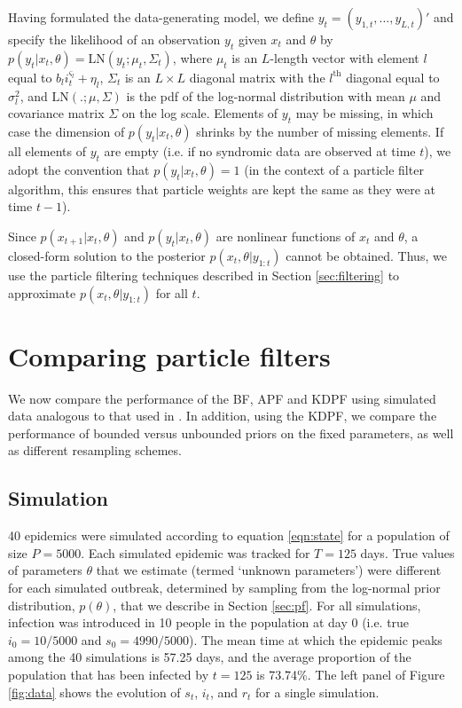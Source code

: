 \documentclass{elsarticle}
\begin{document}
Having formulated the data-generating model, we define $y_t = (y_{1,t},\ldots,y_{L,t})'$ and specify the likelihood of an observation $y_t$ given $x_t$ and $\theta$ by $p(y_t|x_t,\theta) = \mbox{LN}(y_t;\mu_t,\Sigma_t)$, where $\mu_t$ is an $L$-length vector with element $l$ equal to $b_li_t^{\varsigma_l} + \eta_l$, $\Sigma_t$ is an $L \times L$ diagonal matrix with the $l^{\mbox{th}}$ diagonal equal to $\sigma_l^2$, and $\mbox{LN}(.;\mu,\Sigma)$ is the pdf of the log-normal distribution with mean $\mu$ and covariance matrix $\Sigma$ on the log scale. Elements of $y_t$ may be missing, in which case the dimension of $p(y_t|x_t,\theta)$ shrinks by the number of missing elements. If all elements of $y_t$ are empty (i.e. if no syndromic data are observed at time $t$), we adopt the convention that $p(y_t|x_t,\theta) = 1$ (in the context of a particle filter algorithm, this ensures that particle weights are kept the same as they were at time $t-1$).

Since $p(x_{t+1}|x_t,\theta)$ and $p(y_t|x_t,\theta)$ are nonlinear functions of $x_t$ and $\theta$, a closed-form solution to the posterior $p(x_t,\theta|y_{1:t})$ cannot be obtained. Thus, we use the particle filtering techniques described in Section \ref{sec:filtering} to approximate $p(x_t,\theta|y_{1:t})$ for all $t$.

\section{Comparing particle filters} \label{sec:results}

We now compare the performance of the BF, APF and KDPF using simulated data analogous to that used in \citep{skvortsov2012monitoring}. In addition, using the KDPF, we compare the performance of bounded versus unbounded priors on the fixed parameters, as well as different resampling schemes.

\subsection{Simulation}

40 epidemics were simulated according to equation \eqref{eqn:state} for a population of size $P = 5000$. Each simulated epidemic was tracked for $T = 125$ days. True values of parameters $\theta$ that we estimate (termed `unknown parameters') were different for each simulated outbreak, determined by sampling from the log-normal prior distribution, $p(\theta)$, that we describe in Section \ref{sec:pf}. For all simulations, infection was introduced in 10 people in the population at day 0 (i.e. true $i_0 = 10/5000$ and $s_0 = 4990/5000$). The mean time at which the epidemic peaks among the 40 simulations is 57.25 days, and the average proportion of the population that has been infected by $t = 125$ is 73.74\%. The left panel of Figure \ref{fig:data} shows the evolution of $s_t$, $i_t$, and $r_t$ for a single simulation.
\end{document}
